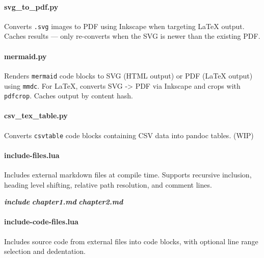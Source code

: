 \documentclass[
]{article}
\newenvironment{Shaded}{}{}
\newcommand{\InformationTok}[1]{\textcolor[rgb]{0.38,0.63,0.69}{\textbf{\textit{#1}}}}
\begin{document}
\paragraph{svg\_to\_pdf.py}\label{svg_to_pdf.py}

Converts \texttt{.svg} images to PDF using Inkscape when targeting LaTeX
output. Caches results --- only re-converts when the SVG is newer than
the existing PDF.

\paragraph{mermaid.py}\label{mermaid.py}

Renders \texttt{mermaid} code blocks to SVG (HTML output) or PDF (LaTeX
output) using \texttt{mmdc}. For LaTeX, converts SVG -\textgreater{} PDF
via Inkscape and crops with \texttt{pdfcrop}. Caches output by content
hash.

\paragraph{csv\_tex\_table.py}\label{csv_tex_table.py}

Converts \texttt{csvtable} code blocks containing CSV data into pandoc
tables. (WIP)

\paragraph{include-files.lua}\label{include-files.lua}

Includes external markdown files at compile time. Supports recursive
inclusion, heading level shifting, relative path resolution, and comment
lines.

\begin{Shaded}
\begin{Highlighting}[]
\InformationTok{\textasciigrave{}\textasciigrave{}\textasciigrave{}include}
\InformationTok{chapter1.md}
\InformationTok{chapter2.md}
\InformationTok{\textasciigrave{}\textasciigrave{}\textasciigrave{}}
\end{Highlighting}
\end{Shaded}

\paragraph{include-code-files.lua}\label{include-code-files.lua}

Includes source code from external files into code blocks, with optional
line range selection and dedentation.
\end{document}
